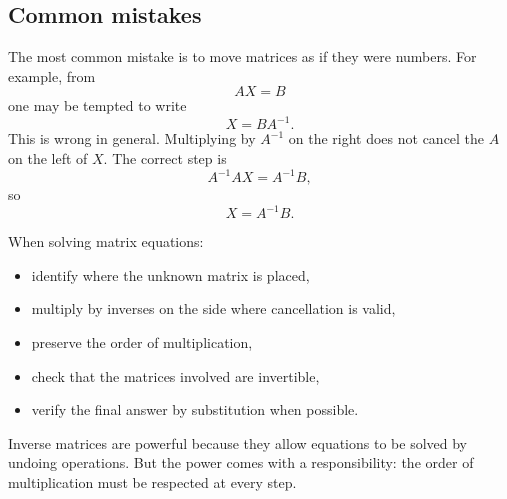\subsection{Common mistakes}

The most common mistake is to move matrices as if they were numbers. For example, from
\[
AX=B
\]
one may be tempted to write
\[
X=BA^{-1}.
\]
This is wrong in general. Multiplying by \(A^{-1}\) on the right does not cancel the \(A\) on the left of \(X\). The correct step is
\[
A^{-1}AX=A^{-1}B,
\]
so
\[
X=A^{-1}B.
\]

\begin{summarybox}
When solving matrix equations:
\begin{itemize}
\item identify where the unknown matrix is placed,
\item multiply by inverses on the side where cancellation is valid,
\item preserve the order of multiplication,
\item check that the matrices involved are invertible,
\item verify the final answer by substitution when possible.
\end{itemize}
\end{summarybox}

Inverse matrices are powerful because they allow equations to be solved by undoing operations. But the power comes with a responsibility: the order of multiplication must be respected at every step.
